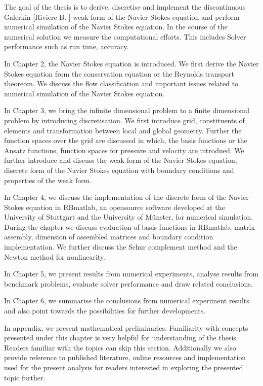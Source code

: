 \documentclass[a4paper,openany]{book}
\begin{document}
The goal of the thesis is to derive, discretise and implement the discontinuous Galerkin [Riviere B. \cite{riviere}] weak form of the Navier Stokes equation and perform numerical simulation of the Navier Stokes equation. In the course of the numerical solution we measure the computational efforts. This includes Solver performance such as run time, accuracy.

In Chapter 2, the Navier Stokes equation is introduced. We first derive the Navier Stokes equation from the conservation equation or the Reynolds transport theoreom. We discuss the flow classification and important issues related to numerical simulation of the Navier Stokes equation. 

In Chapter 3, we bring the infinite dimensional problem to a finite dimensional problem by introducing discretisation. We first introduce grid, constituents of elements and transformation between local and global geometry. Further the function spaces over the grid are discussed in which, the basis functions or the Ansatz functions, function spaces for pressure and velocity are introdued. We further introduce and discuss the weak form of the Navier Stokes equation, discrete form of the Navier Stokes equation with boundary conditions and properties of the weak form.

In Chapter 4, we discuss the implementation of the discrete form of the Navier Stokes equation in RBmatlab, an opensource software developed at the University of Stuttgart and the University of M\"unster, for numerical simulation. During the chapter we discuss evaluation of basis functions in RBmatlab, matrix assembly, dimension of assembled matrices and boundary condition implementation. We further discuss the Schur complement method and the Newton method for nonlinearity.

In Chapter 5, we present results from numerical experiments, analyse results from benchmark problems, evaluate solver performance and draw related conclusions.

In Chapter 6, we summarise the conclusions from numerical experiment results and also point towards the possibilities for further developments.

In appendix, we present mathematical preliminaries. Familiarity with concepts presented under this chapter is very helpful for understanding of the thesis. Readers familiar with the topics can skip this section. Additionally we also provide reference to published literature, online resources and implementation used for the present analysis for readers interested in exploring the presented topic further.
\end{document}
